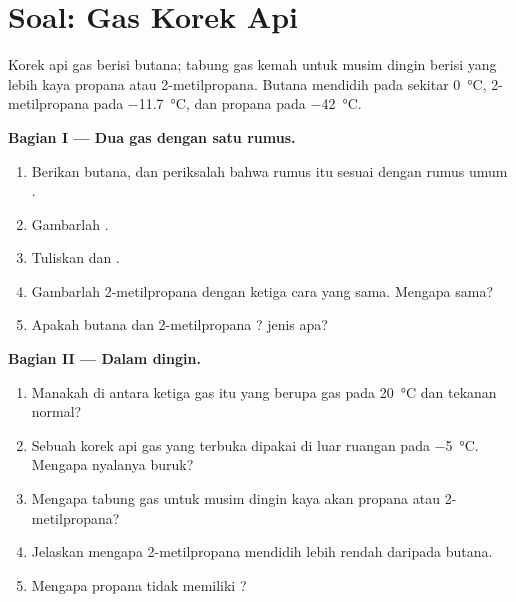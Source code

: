 \section{Soal: Gas Korek Api}

\begin{problem}
\label{pb:g11:organic-skeletons:1}
Korek api gas berisi butana; tabung gas kemah untuk musim dingin berisi
 yang lebih kaya propana atau 2-metilpropana. Butana mendidih
pada sekitar \qty{0}{\celsius}, 2-metilpropana pada
\qty{-11.7}{\celsius}, dan propana pada \qty{-42}{\celsius}.

\medskip
\noindent\textbf{Bagian I --- Dua gas dengan satu rumus.}
\begin{enumerate}
  \item Berikan  butana, dan periksalah bahwa rumus itu
        sesuai dengan rumus umum .
  \item Gambarlah .
  \item Tuliskan  dan .
  \item Gambarlah 2-metilpropana dengan ketiga cara yang sama. Mengapa
         sama?
  \item Apakah butana dan 2-metilpropana ?  jenis apa?
\end{enumerate}

\medskip
\noindent\textbf{Bagian II --- Dalam  dingin.}
\begin{enumerate}[resume]
  \item Manakah di antara ketiga gas itu yang berupa gas pada
        \qty{20}{\celsius} dan tekanan normal?
  \item Sebuah korek api gas yang terbuka dipakai di luar ruangan pada
        \qty{-5}{\celsius}. Mengapa nyalanya buruk?
  \item Mengapa tabung gas untuk musim dingin kaya akan propana atau
        2-metilpropana?
  \item Jelaskan mengapa 2-metilpropana mendidih lebih rendah daripada
        butana.
  \item Mengapa propana tidak memiliki ?
\end{enumerate}


\end{problem}
